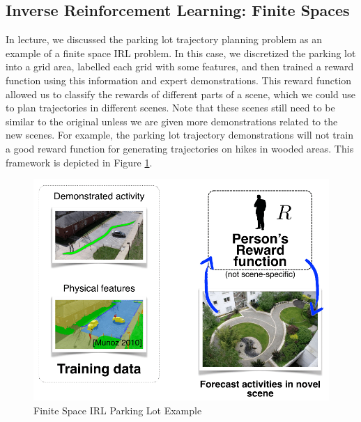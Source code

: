 \documentclass[11pt]{article}
\begin{document}
\subsection{Inverse Reinforcement Learning: Finite Spaces} 
In lecture, we discussed the parking lot trajectory planning problem as an example of a finite space IRL problem. In this case, we discretized the parking lot into a grid area, labelled each grid with some features, and then trained a reward function using this information and expert demonstrations. This reward function allowed us to classify the rewards of different parts of a scene, which we could use to plan trajectories in different scenes. Note that these scenes still need to be similar to the original unless we are given more demonstrations related to the new scenes. For example, the parking lot trajectory demonstrations will not train a good reward function for generating trajectories on hikes in wooded areas. This framework is depicted in Figure \ref{img:irl_parking_lot}.

\begin{figure}[H]
\centering
\includegraphics[width=4.5in]{parking_lot_example.png}
\caption{Finite Space IRL Parking Lot Example \cite{activityForecasting}} %
\label{img:irl_parking_lot}
\end{figure}


 





\end{document}
